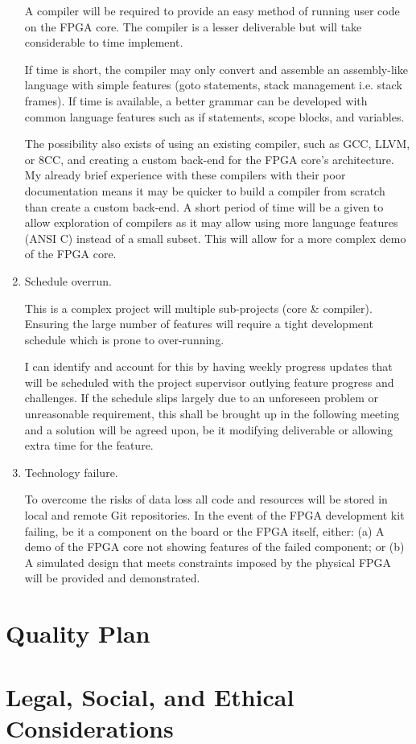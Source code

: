 \documentclass[11pt,a4paper]{article}
\begin{document}
\begin{enumerate}
{A compiler will be required to provide an easy method of running user code on the FPGA core. The compiler is a lesser deliverable but will take considerable to time implement.

If time is short, the compiler may only convert and assemble an assembly-like language with simple features (goto statements, stack management i.e. stack frames). If time is available, a better grammar can be developed with common language features such as if statements, scope blocks, and variables.

The possibility also exists of using an existing compiler, such as GCC, LLVM, or 8CC, and creating a custom back-end for the FPGA core's architecture. My already brief experience with these compilers with their poor documentation means it may be quicker to build a compiler from scratch than create a custom back-end. A short period of time will be a given to allow exploration of compilers as it may allow using more language features (ANSI C) instead of a small subset. This will allow for a more complex demo of the FPGA core.
}

\item{
Schedule overrun. 

This is a complex project will multiple sub-projects (core \& compiler). Ensuring the large number of features will require a tight development schedule which is prone to over-running.

I can identify and account for this by having weekly progress updates that will be scheduled with the project supervisor outlying feature progress and challenges. If the schedule slips largely due to an unforeseen problem or unreasonable requirement, this shall be brought up in the following meeting and a solution will be agreed upon, be it modifying deliverable or allowing extra time for the feature.
}

\item{Technology failure. 

To overcome the risks of data loss all code and resources will be stored in local and remote Git repositories.
In the event of the FPGA development kit failing, be it a component on the board or the FPGA itself, either: (a) A demo of the FPGA core not showing features of the failed component; or (b) A simulated design that meets constraints imposed by the physical FPGA will be provided and demonstrated.
}
\end{enumerate}


\section{Quality Plan}

\section{Legal, Social, and Ethical Considerations}

\newpage
 
\end{document}
